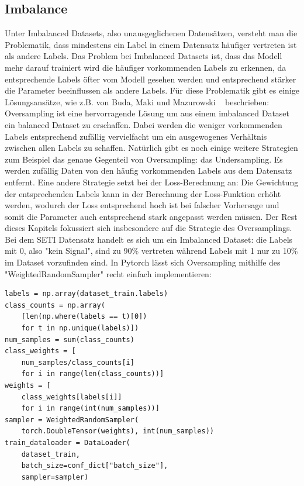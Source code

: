 \documentclass[12pt, a4paper]{article}
\begin{document}
\subsection{Imbalance}
Unter Imbalanced Datasets, also unausgeglichenen Datensätzen, versteht man die Problematik, dass mindestens ein Label in einem Datensatz häufiger vertreten ist als andere Labels. Das Problem bei Imbalanced Datasets ist, dass das Modell mehr darauf trainiert wird die häufiger vorkommenden Labels zu erkennen, da entsprechende Labels öfter vom Modell gesehen werden und entsprechend stärker die Parameter beeinflussen als andere Labels. Für diese Problematik gibt es einige Lösungsansätze, wie z.B. von Buda, Maki und Mazurowski ~\cite{o1} beschrieben:
\newline
Oversampling ist eine hervorragende Lösung um aus einem imbalanced Dataset ein balanced Dataset zu erschaffen. Dabei werden die weniger vorkommenden Labels entsprechend zufällig vervielfacht um ein ausgewogenes Verhältnis zwischen allen Labels zu schaffen. Natürlich gibt es noch einige weitere Strategien zum Beispiel das genaue Gegenteil von Oversampling: das Undersampling. Es werden zufällig Daten von den häufig vorkommenden Labels aus dem Datensatz entfernt. Eine andere Strategie setzt bei der Loss-Berechnung an: Die Gewichtung der entsprechenden Labels kann in der Berechnung der Loss-Funktion erhöht werden, wodurch der Loss entsprechend hoch ist bei falscher Vorhersage und somit die Parameter auch entsprechend stark angepasst werden müssen. Der Rest dieses Kapitels fokussiert sich insbesondere auf die Strategie des Oversamplings.
\newline
Bei dem SETI Datensatz handelt es sich um ein Imbalanced Dataset: die Labels mit 0, also "kein Signal", sind zu 90\% vertreten während Labels mit 1 nur zu 10\% im Dataset vorzufinden sind. In Pytorch lässt sich Oversampling mithilfe des "WeightedRandomSampler" recht einfach implementieren:
\begin{lstlisting}
labels = np.array(dataset_train.labels)
class_counts = np.array(
	[len(np.where(labels == t)[0]) 
	for t in np.unique(labels)])
num_samples = sum(class_counts)
class_weights = [
	num_samples/class_counts[i] 
	for i in range(len(class_counts))]
weights = [
	class_weights[labels[i]] 
	for i in range(int(num_samples))]
sampler = WeightedRandomSampler(
	torch.DoubleTensor(weights), int(num_samples))
train_dataloader = DataLoader(
	dataset_train, 
	batch_size=conf_dict["batch_size"], 
	sampler=sampler)
\end{lstlisting}
\end{document}

